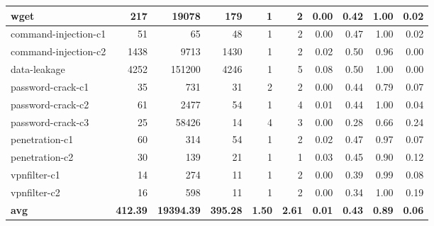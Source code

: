 \begin{table*}[!t]
{\begin{tabular}{|l|r|r|r|r|r|r|r|r|r|}
wget                    & 217                  & 19078             & 179         & 1                & 2       & 0.00                      & 0.42           & 1.00                         & 0.02                 \\ \hline
command-injection-c1      & 51                   & 65                & 48          & 1                & 2       & 0.00                      & 0.47           & 1.00                         & 0.02                 \\ \hline
command-injection-c2      & 1438                 & 9713              & 1430        & 1                & 2       & 0.02                      & 0.50           & 0.96                         & 0.00                    \\ \hline
data-leakage        & 4252                 & 151200            & 4246        & 1                & 5       & 0.08                      & 0.50           & 1.00                         & 0.00                    \\ \hline
password-crack-c1 & 35                   & 731               & 31          & 2                & 2       & 0.00                      & 0.44           & 0.79                         & 0.07                 \\ \hline
password-crack-c2 & 61                   & 2477              & 54          & 1                & 4       & 0.01                      & 0.44           & 1.00                         & 0.04                 \\ \hline
password-crack-c3 & 25                   & 58426             & 14          & 4                & 3       & 0.00                      & 0.28           & 0.66                         & 0.24                 \\ \hline
penetration-c1 & 60                   & 314               & 54          & 1                & 2       & 0.02                      & 0.47           & 0.97                         & 0.07                 \\ \hline
penetration-c2 & 30                   & 139               & 21          & 1                & 1       & 0.03                      & 0.45           & 0.90                         & 0.12                 \\ \hline
vpnfilter-c1      & 14                   & 274               & 11          & 1                & 2       & 0.00                      & 0.39           & 0.99                         & 0.08                 \\ \hline
vpnfilter-c2      & 16                   & 598               & 11          & 1                & 2       & 0.00                      & 0.34           & 1.00                         & 0.19                 \\ \hline
\textbf{avg} &\textbf{412.39} &\textbf{19394.39} &\textbf{395.28} &\textbf{1.50} &\textbf{2.61} &\textbf{0.01} &\textbf{0.43} &\textbf{0.89} &\textbf{0.06}\\ \hline
\end{tabular}
}
\label{tab:summary}
\end{table*}    
